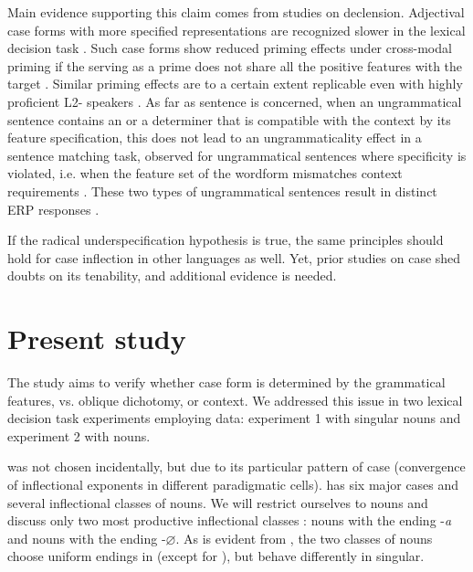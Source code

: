 \documentclass[output=paper, modfonts,newtxmath,hidelinks]{langscibook}
\begin{document}
Main evidence supporting this claim comes from studies on   declension. Adjectival case forms with more specified representations are recognized slower in the lexical decision task \citep{clahsen2001mental}. Such case forms show reduced priming effects under cross-modal priming if the  serving as a prime does not share all the positive features with the target \citep{clahsen2001mental}. Similar priming effects are to a certain extent replicable even with highly proficient L2- speakers \citep{bosch2016accessing, bosch2017time}. As far as sentence  is concerned, when an ungrammatical sentence contains an  or a determiner that is compatible with the context by its feature specification, this does not lead to an ungrammaticality effect in a sentence matching task, observed for ungrammatical sentences where specificity is violated, i.e. when the feature set of the wordform mismatches context requirements \citep{penke2004psycholinguistic}. These two types of ungrammatical sentences result in distinct ERP responses \citep{opitz2013neurophysiological}. 

If the radical underspecification hypothesis is true, the same principles should hold for  case inflection in other languages as well. Yet, prior studies on case  shed doubts on its tenability, and additional evidence is needed.

\section{Present study}\label{sec:2}
The  study aims to verify whether case form  is determined by the grammatical features,  vs. oblique dichotomy, or context. We addressed this issue in two lexical decision task experiments employing  data: experiment 1 with singular nouns and experiment 2 with  nouns.

 was not chosen incidentally, but due to its particular pattern of case  (convergence of inflectional exponents in different paradigmatic cells).  has six major cases and several inflectional classes of nouns. We will restrict ourselves to  nouns and discuss only two most productive inflectional classes \citep{wiese2004categories}:  nouns with the  ending -\textit{a} and  nouns with the   ending -$\varnothing$. As is evident from , the two classes of nouns choose uniform endings in  (except for ), but behave differently in singular.
\end{document}
